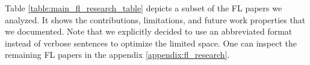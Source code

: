 \begin{figure}[p]
    
\end{figure}

Table \ref{table:main_fl_research_table} depicts a subset of the FL papers we analyzed.
It shows the contributions, limitations, and future work properties that we documented.
Note that we explicitly decided to use an abbreviated format instead of verbose sentences
to optimize the limited space.
One can inspect the remaining FL papers in the appendix \ref{appendix:fl_research}.
















